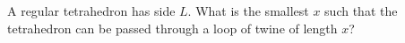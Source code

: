 A regular tetrahedron has side $L$. What is the smallest $x$ such that the tetrahedron can be passed through a loop of twine of length $x$?